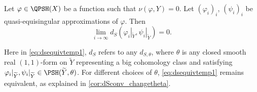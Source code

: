 \begin{proposition}\label{prop:traceindquasiequisingapp}
    Let $\varphi\in \QPSH(X)$ be a function such that $\nu(\varphi,Y)=0$. Let $(\varphi_i)_i$, $(\psi_i)_i$ be quasi-equisingular approximations of $\varphi$. Then
    \begin{equation}\label{eq:dsequivtemp1}
        \lim_{i\to\infty} d_S\left(\varphi_i|_{\widetilde{Y}},\psi_i|_{\widetilde{Y}}\right)=0.
    \end{equation}
\end{proposition}
Here in \eqref{eq:dsequivtemp1}, $d_S$ refers to any $d_{S,\theta}$, where $\theta$ is any closed smooth real $(1,1)$-form on $\widetilde{Y}$ representing a big cohomology class and satisfying $\varphi_i|_{\widetilde{Y}},\psi_i|_{\widetilde{Y}}\in \PSH(\widetilde{Y},\theta)$. For different choices of $\theta$, \eqref{eq:dsequivtemp1} remains equivalent, as explained in \cref{cor:dSconv_changetheta}.
